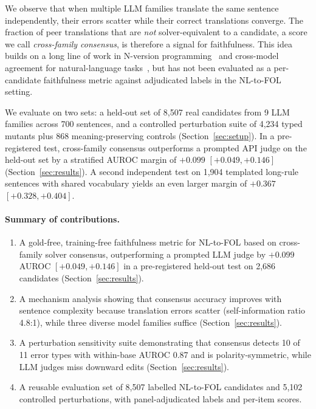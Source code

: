 \documentclass[11pt,letterpaper]{article}
\begin{document}
We observe that when multiple LLM families translate the same sentence independently, their errors scatter while their correct translations converge. The fraction of peer translations that are \emph{not} solver-equivalent to a candidate, a score we call \emph{cross-family consensus}, is therefore a signal for faithfulness. This idea builds on a long line of work in N-version programming~\citep{Eckhardt1985, Knight1986} and cross-model agreement for natural-language tasks~\citep{Liu2026, Verga2024, Zhang2023}, but has not been evaluated as a per-candidate faithfulness metric against adjudicated labels in the NL-to-FOL setting.

We evaluate on two sets: a held-out set of 8,507 real candidates from 9 LLM families across 700 sentences, and a controlled perturbation suite of 4,234 typed mutants plus 868 meaning-preserving controls (Section~\ref{sec:setup}). In a pre-registered test, cross-family consensus outperforms a prompted API judge on the held-out set by a stratified AUROC margin of $+0.099$ $[+0.049, +0.146]$ (Section~\ref{sec:results}). A second independent test on 1,904 templated long-rule sentences with shared vocabulary yields an even larger margin of $+0.367$ $[+0.328, +0.404]$.

\paragraph{Summary of contributions.}
\begin{enumerate}
  \item A gold-free, training-free faithfulness metric for NL-to-FOL based on cross-family solver consensus, outperforming a prompted LLM judge by $+0.099$ AUROC $[+0.049, +0.146]$ in a pre-registered held-out test on 2,686 candidates (Section~\ref{sec:results}).
  \item A mechanism analysis showing that consensus accuracy improves with sentence complexity because translation errors scatter (self-information ratio 4.8:1), while three diverse model families suffice (Section~\ref{sec:results}).
  \item A perturbation sensitivity suite demonstrating that consensus detects 10 of 11 error types with within-base AUROC 0.87 and is polarity-symmetric, while LLM judges miss downward edits (Section~\ref{sec:results}).
  \item A reusable evaluation set of 8,507 labelled NL-to-FOL candidates and 5,102 controlled perturbations, with panel-adjudicated labels and per-item scores.
\end{enumerate}
\end{document}

